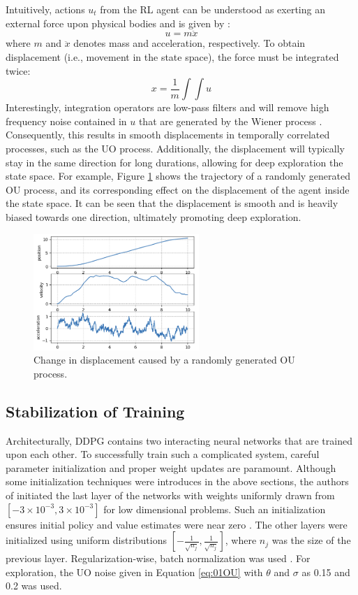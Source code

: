 Intuitively, actions $u_t$ from the RL agent can be understood as exerting an external force upon physical bodies and is given by \cite{physics}:
\begin{equation}
    u = m \ddot{x}
\end{equation}
where $m$ and  $\ddot{x}$ denotes mass and acceleration, respectively.  To obtain displacement (i.e., movement in the state space), the force must be integrated twice:
\begin{equation}
    x = \frac{1}{m}\int \int u
\end{equation}
Interestingly, integration operators are low-pass filters and will remove high frequency noise contained in $u$ that are generated by the Wiener process \cite{process_control_ref13}. Consequently, this results in smooth displacements in temporally correlated processes, such as the UO process.  Additionally, the displacement will typically stay in the same direction for long durations, allowing for deep exploration the state space. For example, Figure \ref{fig:01OU} shows the trajectory of a randomly generated OU process, and its corresponding effect on the displacement of the agent inside the state space.  It can be seen that the displacement is smooth and is heavily biased towards one direction, ultimately promoting deep exploration.

\begin{figure}[H]
    \centering
    \includegraphics[width=0.56\textwidth]{images/ch1/01OU.jpeg}
    \caption{Change in displacement caused by a randomly generated OU process.}
    \label{fig:01OU}
\end{figure}   


\subsection{Stabilization of Training}
Architecturally, DDPG contains two interacting neural networks that are trained upon each other.  To successfully train such a complicated system, careful parameter initialization and proper weight updates are paramount.  Although some initialization techniques were introduces in the above sections, the authors of \cite{ddpg} initiated the last layer of the networks with weights uniformly drawn from $[-3 \times 10^{-3}, 3 \times 10^{-3}]$ for low dimensional problems. Such an initialization ensures initial policy and value estimates were near zero \cite{ddpg}. The other layers were initialized using uniform distributions $[-\frac{1}{\sqrt{n_j}}, \frac{1}{\sqrt{n_j}}]$, where $n_j$ was the size of the previous layer.  Regularization-wise, batch normalization was used \cite{batch_norm}. For exploration, the UO noise given in Equation \ref{eq:01OU} with $\theta$ and $\sigma$ as 0.15 and 0.2 was used.

